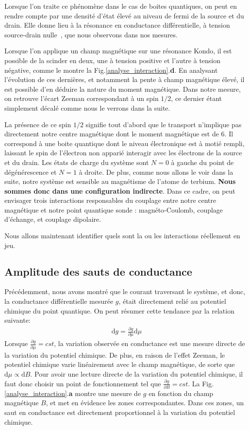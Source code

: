 Lorsque l'on traite ce phénomène dans le cas de boites quantiques, on peut en rendre compte par une densité d'état élevé au niveau de fermi de la source et du drain. Elle donne lieu à la résonance en conductance différentielle, à tension source-drain nulle~\cite{Goldhaber-Gordon1998}, que nous observons dans nos mesures.

Lorsque l'on applique un champ magnétique sur une résonance Kondo, il est possible de la scinder en deux, une à tension positive et l'autre à tension négative, comme le montre la Fig.\ref{analyse_interaction}.\textbf{d}. En analysant l'évolution de ces dernières, et notamment la pente à champ magnétique élevé, il est possible d'en déduire la nature du moment magnétique. Dans notre mesure, on retrouve l'écart Zeeman correspondant à un spin $1/2$, ce dernier étant simplement décalé comme nous le verrons dans la suite.

La présence de ce spin $1/2$ signifie tout d'abord que le transport n'implique pas directement notre centre magnétique dont le moment magnétique est de $6$. Il correspond à une boite quantique dont le niveau électronique est à motié rempli, laissant le spin de l'électron non apparié interagir avec les électrons de la source et du drain. Les états de charge du système sont $N=0$ à gauche du point de dégénérescence et $N=1$ à droite. De plus, comme nous allons le voir dans la suite, notre système est sensible au magnétisme de l'atome de terbium. \textbf{Nous sommes donc dans une configuration indirecte}. Dans ce cadre, on peut envisager trois interactions responsables du couplage entre notre centre magnétique et notre point quantique sonde : magnéto-Coulomb, couplage d'échange, et couplage dipolaire.

Nous allons maintenant identifier quels sont la ou les interactions réellement en jeu.

\subsection{Amplitude des sauts de conductance}
Précédemment, nous avons montré que le courant traversant le système, et donc, la conductance différentielle mesurée $g$, était directement relié au potentiel chimique du point quantique. On peut résumer cette tendance par la relation suivante:
\begin{eqnarray}
\text{d}g = \frac{\partial g}{\partial \mu} \text{d} \mu
\end{eqnarray}
Lorsque $\frac{\partial g}{\partial \mu} = cst$, la variation observée en conductance est une mesure directe de la variation du potentiel chimique. De plus, en raison de l'effet Zeeman, le potentiel chimique varie linéairement avec le champ magnétique, de sorte que $\text{d}\mu \propto \text{d}B$. Pour avoir une lecture directe de la variation du potentiel chimique, il faut donc choisir un point de fonctionnement tel que $\frac{\partial g}{\partial B} = cst$. La Fig.\ref{analyse_interaction}.\textbf{a} montre une mesure de $g$ en fonction du champ magnétique $B$, et met en évidence les zones correspondantes. Dans ces zones, un saut en conductance est directement proportionnel à la variation du potentiel chimique. 

